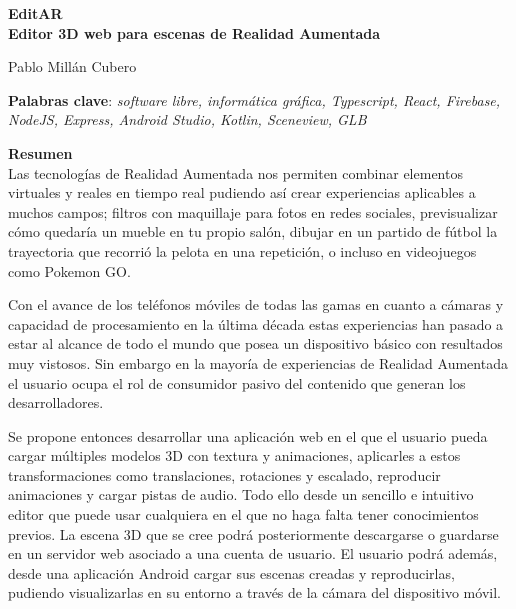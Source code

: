 \thispagestyle{empty}

\begin{center}
{\large\bfseries EditAR \\ Editor 3D web para escenas de Realidad Aumentada }\\
\end{center}
\begin{center}
Pablo Millán Cubero\\
\end{center}


\vspace{0.5cm}
\noindent\textbf{Palabras clave}: \textit{software libre, informática gráfica, Typescript, React, Firebase, NodeJS, Express, Android Studio, Kotlin, Sceneview, GLB}
\vspace{0.7cm}

\noindent\textbf{Resumen}\\
Las tecnologías de Realidad Aumentada nos permiten combinar elementos virtuales y reales en tiempo real pudiendo así crear experiencias aplicables a muchos campos; filtros con maquillaje para fotos en redes sociales, previsualizar cómo quedaría un mueble en tu propio salón, dibujar en un partido de fútbol la trayectoria que recorrió la pelota en una repetición, o incluso en videojuegos como Pokemon GO.

Con el avance de los teléfonos móviles de todas las gamas en cuanto a cámaras y capacidad de procesamiento en la última década estas experiencias han pasado a estar al alcance de todo el mundo que posea un dispositivo básico con resultados muy vistosos. Sin embargo en la mayoría de experiencias de Realidad Aumentada el usuario ocupa el rol de consumidor pasivo del contenido que generan los desarrolladores.

Se propone entonces desarrollar una aplicación web en el que el usuario pueda cargar múltiples modelos 3D con textura y animaciones, aplicarles a estos transformaciones como translaciones, rotaciones y escalado, reproducir animaciones y cargar pistas de audio. Todo ello desde un sencillo e intuitivo editor que puede usar cualquiera en el que no haga falta tener conocimientos previos. La escena 3D que se cree podrá posteriormente descargarse o guardarse en un servidor web asociado a una cuenta de usuario. El usuario podrá además, desde una aplicación Android cargar sus escenas creadas y reproducirlas, pudiendo visualizarlas en su entorno a través de la cámara del dispositivo móvil.



